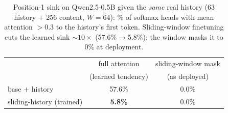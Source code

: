\begin{table}[t]
\centering
\small
\begin{tabular}{lcc}
\toprule
 & full attention & sliding-window mask \\
 & (learned tendency) & (as deployed) \\
\midrule
base $+$ history & 57.6\% & 0.0\% \\
sliding-history (trained) & \textbf{5.8\%} & 0.0\% \\
\bottomrule
\end{tabular}
\caption{Position-1 sink on Qwen2.5-0.5B given the \emph{same} real history (63 history $+$ 256 content, $W{=}64$): \% of softmax heads with mean attention $>0.3$ to the history's first token. Sliding-window finetuning cuts the learned sink $\sim$$10\times$ (57.6\%$\to$5.8\%); the window masks it to 0\% at deployment.}
\label{tab:sink05b}
\end{table}
